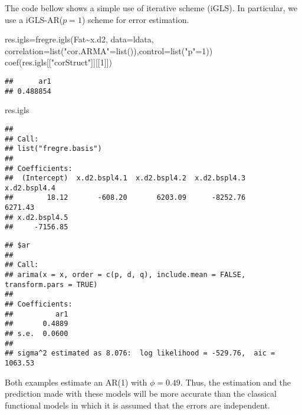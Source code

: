 \documentclass[
]{book}
\newenvironment{Shaded}{\begin{snugshade}}{\end{snugshade}}
\newcommand{\AttributeTok}[1]{\textcolor[rgb]{0.77,0.63,0.00}{#1}}
\newcommand{\DecValTok}[1]{\textcolor[rgb]{0.00,0.00,0.81}{#1}}
\newcommand{\FunctionTok}[1]{\textcolor[rgb]{0.00,0.00,0.00}{#1}}
\newcommand{\NormalTok}[1]{#1}
\newcommand{\OtherTok}[1]{\textcolor[rgb]{0.56,0.35,0.01}{#1}}
\newcommand{\SpecialCharTok}[1]{\textcolor[rgb]{0.00,0.00,0.00}{#1}}
\newcommand{\StringTok}[1]{\textcolor[rgb]{0.31,0.60,0.02}{#1}}
\begin{document}
The code bellow shows a simple use of iterative scheme (iGLS). In particular, we use a iGLS-AR(\(p=1\)) scheme for error estimation.

\begin{Shaded}
\begin{Highlighting}[]
\NormalTok{res.igls}\OtherTok{=}\FunctionTok{fregre.igls}\NormalTok{(Fat}\SpecialCharTok{\textasciitilde{}}\NormalTok{x.d2, }\AttributeTok{data=}\NormalTok{ldata, }\AttributeTok{correlation=}\FunctionTok{list}\NormalTok{(}\StringTok{"cor.ARMA"}\OtherTok{=}\FunctionTok{list}\NormalTok{()),}\AttributeTok{control=}\FunctionTok{list}\NormalTok{(}\StringTok{"p"}\OtherTok{=}\DecValTok{1}\NormalTok{))}
\FunctionTok{coef}\NormalTok{(res.igls[[}\StringTok{"corStruct"}\NormalTok{]][[}\DecValTok{1}\NormalTok{]])}
\end{Highlighting}
\end{Shaded}

\begin{verbatim}
##      ar1 
## 0.488854
\end{verbatim}

\begin{Shaded}
\begin{Highlighting}[]
\NormalTok{res.igls}
\end{Highlighting}
\end{Shaded}

\begin{verbatim}
## 
## Call:
## list("fregre.basis")
## 
## Coefficients:
##  (Intercept)  x.d2.bspl4.1  x.d2.bspl4.2  x.d2.bspl4.3  x.d2.bspl4.4  
##        18.12       -608.20       6203.09      -8252.76       6271.43  
## x.d2.bspl4.5  
##     -7156.85
\end{verbatim}

\begin{Shaded}
\end{Shaded}

\begin{verbatim}
## $ar
## 
## Call:
## arima(x = x, order = c(p, d, q), include.mean = FALSE, transform.pars = TRUE)
## 
## Coefficients:
##          ar1
##       0.4889
## s.e.  0.0600
## 
## sigma^2 estimated as 8.076:  log likelihood = -529.76,  aic = 1063.53
\end{verbatim}

Both examples estimate an AR(1) with \(\phi=0.49\). Thus, the estimation and the prediction made with these models will be more accurate than the classical functional models in which it is assumed that the errors are independent.
\end{document}
